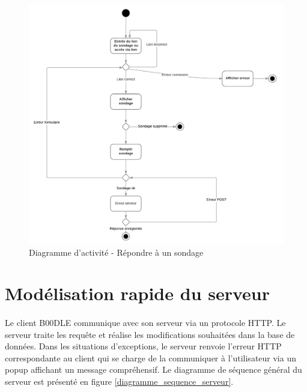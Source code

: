 \documentclass[titlepage]{report}
\begin{document}
\begin{figure}[h]
	\caption{Diagramme d'activité - Répondre à un sondage}
	\label{diagramme_activite_répondreSondage}
	\centering
	\includegraphics[scale=0.8]{figures/diagrammes/activite_repondreSondage.png}
\end{figure}


\clearpage

\section{Modélisation rapide du serveur} 
\label{part_shortModelServer}

\paragraph{} Le client B00DLE communique avec son serveur via un protocole HTTP. Le serveur traite les requête et réalise les modifications souhaitées dans la base de données. Dans les situations d'exceptions, le serveur renvoie l'erreur HTTP correspondante au client qui se charge de la communiquer à l'utilisateur via un popup affichant un message compréhensif. Le diagramme de séquence général du serveur est présenté en figure \ref{diagramme_sequence_serveur}.
\end{document}
